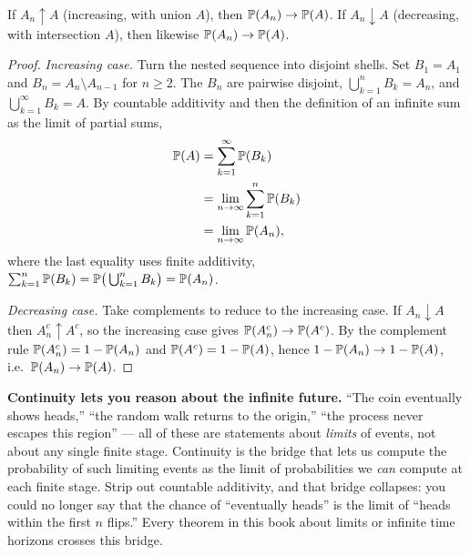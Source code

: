 \begin{theorem}
\label{ch03:thm-continuity}
If $A_n \uparrow A$ (increasing, with union $A$), then $\P(A_n) \to \P(A)$. If
$A_n \downarrow A$ (decreasing, with intersection $A$), then likewise
$\P(A_n) \to \P(A)$.
\end{theorem}

\begin{proof}
\emph{Increasing case.} Turn the nested sequence into disjoint shells. Set
$B_1 = A_1$ and $B_n = A_n \setminus A_{n-1}$ for $n \ge 2$. The $B_n$ are
pairwise disjoint, $\bigcup_{k=1}^n B_k = A_n$, and $\bigcup_{k=1}^\infty B_k =
A$. By countable additivity and then the definition of an infinite sum as the
limit of partial sums,
\begin{align*}
\P(A) &= \sum_{k=1}^{\infty} \P(B_k) \\
&= \lim_{n\to\infty} \sum_{k=1}^{n} \P(B_k) \\
&= \lim_{n\to\infty} \P(A_n),
\end{align*}
where the last equality uses finite additivity, $\sum_{k=1}^n \P(B_k) =
\P\!\big(\bigcup_{k=1}^n B_k\big) = \P(A_n)$.

\emph{Decreasing case.} Take complements to reduce to the increasing case. If
$A_n \downarrow A$ then $A_n^c \uparrow A^c$, so the increasing case gives
$\P(A_n^c) \to \P(A^c)$. By the complement rule $\P(A_n^c) = 1 - \P(A_n)$ and
$\P(A^c) = 1 - \P(A)$, hence $1 - \P(A_n) \to 1 - \P(A)$, i.e.\
$\P(A_n) \to \P(A)$.
\end{proof}

\begin{happeningbox}
\textbf{Continuity lets you reason about the infinite future.}
``The coin eventually shows heads,'' ``the random walk returns to the origin,''
``the process never escapes this region'' --- all of these are statements about
\emph{limits} of events, not about any single finite stage. Continuity is the
bridge that lets us compute the probability of such limiting events as the limit
of probabilities we \emph{can} compute at each finite stage. Strip out countable
additivity, and that bridge collapses: you could no longer say that the chance of
``eventually heads'' is the limit of ``heads within the first $n$ flips.'' Every theorem in this book about limits or infinite time horizons crosses this bridge.
\end{happeningbox}

